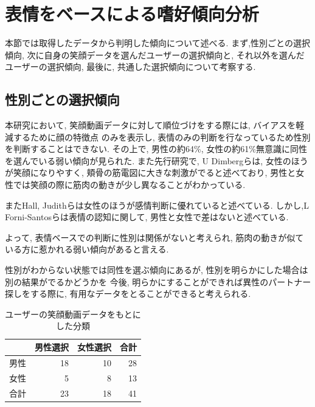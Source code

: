 \section{表情をベースによる嗜好傾向分析}
本節では取得したデータから判明した傾向について述べる.
まず,性別ごとの選択傾向, 次に自身の笑顔データを選んだユーザーの選択傾向と, それ以外を選んだユーザーの選択傾向,
最後に, 共通した選択傾向について考察する.

\subsection{性別ごとの選択傾向}
本研究において, 笑顔動画データに対して順位づけをする際には, バイアスを軽減するために顔の特徴点
のみを表示し, 表情のみの判断を行なっているため性別を判断することはできない.
その上で, 男性の約64\%, 女性の約61\%無意識に同性を選んでいる弱い傾向が見られた.
また先行研究で,
U Dimbergらは, 女性のほうが笑顔になりやすく, 頬骨の筋電図に大きな刺激がでると述べており\cite{dimberg1990gender},
男性と女性では笑顔の際に筋肉の動きが少し異なることがわかっている.

またHall, Judithらは女性のほうが感情判断に優れていると述べている\cite{hall2004gender}.
しかし,L Forni-Santosらは表情の認知に関して, 男性と女性で差はないと述べている.\cite{forni2015influence}

よって, 表情ベースでの判断に性別は関係がないと考えられ, 筋肉の動きが似ている方に惹かれる弱い傾向があると言える.

性別がわからない状態では同性を選ぶ傾向にあるが, 性別を明らかにした場合は別の結果がでるかどうかを
今後, 明らかにすることができれば異性のパートナー探しをする際に, 有用なデータをとることができると考えられる.

\begin{table}[htb]
  \caption{ユーザーの笑顔動画データをもとにした分類}
  \label{tb:agegenderchart}
  \begin{center}
  \begin{tabular}{|l|r|r||r|} \hline
    　&男性選択&女性選択&合計 \\ \hline \hline
    男性&18&10&28 \\
    女性&5&8&13 \\ \hline \hline
    合計&23&18&41 \\ \hline
  \end{tabular}
  \end{center}
\end{table}



